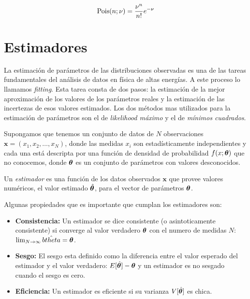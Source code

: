 \begin{equation}
  \Pois(n;\nu) = \frac{\nu^n}{n!} e^{-\nu} %
\end{equation}




\section{Estimadores}

La estimación de parámetros de las distribuciones observadas es una de las
tareas fundamentales del análisis de datos en física de altas energías. A este
proceso lo llamamos \emph{fitting}. Esta tarea consta de dos pasos: la
estimación de la mejor aproximación de los valores de los parámetros reales y la
estimación de las incertezas de esos valores estimados. Los dos métodos mas
utilizados para la estimación de parámetros son el de \emph{likelihood máximo} y
el de \emph{mínimos cuadrados}.

Supongamos que tenemos un conjunto de datos de $N$ observaciones $\bm{x} = (x_1,
x_2, \ldots, x_N)$, donde las medidas $x_i$ son estadísticamente independientes
y cada una está descripta por una función de densidad de probabilidad
$f(x;\bm{\theta})$ que no conocemos, donde $\bm{\theta}$ es un conjunto de parámetros
con valores desconocidos.

Un \emph{estimador} es una función de los datos observados $\bm{x}$ que provee
valores numéricos, el valor estimado $\hat{\bm{\theta}}$, para el vector de
parámetros $\bm{\theta}$.

Algunas propiedades que es importante que cumplan los estimadores son:

\begin{itemize}\itemsep0.2cm\parskip0.2cm
\item[] {\bf Consistencia:}  Un estimador se dice consistente (o asintoticamente consistente) si converge
  al valor verdadero $\bm{\theta}$ con el numero de medidas $N$: $\lim_{N \rightarrow \infty} \hat{btheta} = \bm{\theta}$.

\item[] {\bf Sesgo:} El sesgo esta definido como la diferencia entre el valor esperado del
  estimador y el valor verdadero: $E[\hat{\bm{\theta}}] - \bm{\theta}$ y un estimador es
  no sesgado cuando el sesgo es cero.

\item[] {\bf Eficiencia:} Un estimador es eficiente si su varianza $V[\hat{\bm{\theta}}]$ es chica.
\end{itemize}

